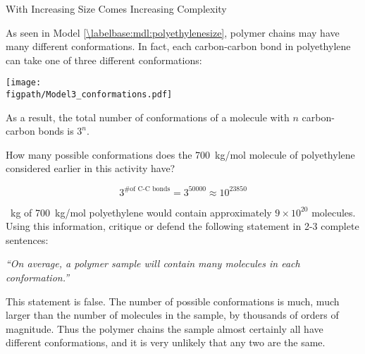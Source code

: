 \begin{activity}{With Increasing Size Comes Increasing Complexity}
\begin{ctqs}
\end{ctqs}



\begin{model}
	\label{\labelbase:mdl:conformations}

	As seen in Model \ref{\labelbase:mdl:polyethylenesize}, polymer chains may have many different conformations.  In fact, each carbon-carbon bond in polyethylene can take one of three different conformations:
	
	\vspace{6pt}
	\centerline{\texttt{[image: \\figpath/Model3\_conformations.pdf]}}
	
	As a result, the total number of conformations of a molecule with $n$ carbon-carbon bonds is $3^n$.

\end{model}

\begin{ctqs}

	\question How many possible conformations does the 700~kg/mol molecule of polyethylene considered earlier in this activity have?
	
		\begin{solution}[1in]
			\begin{equation*}
				3^{\text{\# of C-C bonds}} = 3^{50000} \approx 10^{23850}
			\end{equation*}
		\end{solution}
	
	~kg of 700~kg/mol polyethylene would contain approximately $9\times 10^{20}$ molecules.  Using this information, critique or defend the following statement in 2-3 complete sentences:
	
		\emph{``On average, a polymer sample will contain many molecules in each conformation.''}
	
		\begin{solution}[2.5in]
		
			This statement is false.  The number of possible conformations is much, much larger than the number of molecules in the sample, by thousands of orders of magnitude.  Thus the polymer chains the sample almost certainly all have different conformations, and it is very unlikely that any two are the same.
		\end{solution}
		
\end{ctqs}


\begin{exercises}


\end{exercises}
\end{activity}
